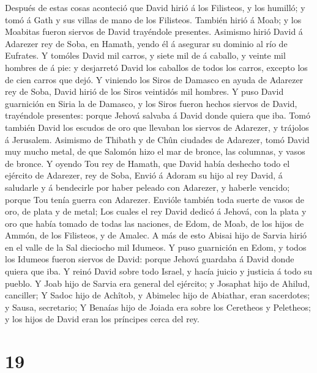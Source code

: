  Después de estas cosas aconteció que David hirió á los
Filisteos, y los humilló; y tomó á Gath y sus villas de mano de los
Filisteos.  También hirió á Moab; y los Moabitas fueron
siervos de David trayéndole presentes.  Asimismo hirió David
á Adarezer rey de Soba, en Hamath, yendo él á asegurar su dominio al río
de Eufrates.  Y tomóles David mil carros, y siete mil de á
caballo, y veinte mil hombres de á pie: y desjarretó David los caballos
de todos los carros, excepto los de cien carros que dejó.  Y
viniendo los Siros de Damasco en ayuda de Adarezer rey de Soba, David
hirió de los Siros veintidós mil hombres.  Y puso David
guarnición en Siria la de Damasco, y los Siros fueron hechos siervos de
David, trayéndole presentes: porque Jehová salvaba á David donde quiera
que iba.  Tomó también David los escudos de oro que llevaban
los siervos de Adarezer, y trájolos á Jerusalem.  Asimismo
de Thibath y de Chûn ciudades de Adarezer, tomó David muy mucho metal,
de que Salomón hizo el mar de bronce, las columnas, y vasos de bronce.
 Y oyendo Tou rey de Hamath, que David había deshecho todo
el ejército de Adarezer, rey de Soba,  Envió á Adoram su
hijo al rey David, á saludarle y á bendecirle por haber peleado con
Adarezer, y haberle vencido; porque Tou tenía guerra con Adarezer.
Envióle también toda suerte de vasos de oro, de plata y de metal;
 Los cuales el rey David dedicó á Jehová, con la plata y
oro que había tomado de todas las naciones, de Edom, de Moab, de los
hijos de Ammón, de los Filisteos, y de Amalec.  A más de
esto Abisai hijo de Sarvia hirió en el valle de la Sal dieciocho mil
Idumeos.  Y puso guarnición en Edom, y todos los Idumeos
fueron siervos de David: porque Jehová guardaba á David donde quiera que
iba.  Y reinó David sobre todo Israel, y hacía juicio y
justicia á todo su pueblo.  Y Joab hijo de Sarvia era
general del ejército; y Josaphat hijo de Ahilud, canciller;
 Y Sadoc hijo de Achîtob, y Abimelec hijo de Abiathar, eran
sacerdotes; y Sausa, secretario;  Y Benaías hijo de Joiada
era sobre los Ceretheos y Peletheos; y los hijos de David eran los
príncipes cerca del rey.

\hypertarget{section-18}{%
\section{19}\label{section-18}}

